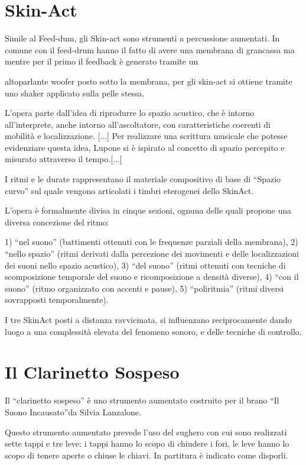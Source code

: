 \section{Skin-Act}

Simile al Feed-dum, gli Skin-act sono strumenti a percussione aumentati.
In comune con il feed-drum hanno il fatto di avere una membrana di grancassa ma
mentre per il primo il feedback è generato tramite un

altoparlante woofer posto sotto la membrana, per gli skin-act si ottiene tramite
uno shaker applicato sulla pelle stessa.

L’opera parte dall’idea di riprodurre lo spazio acustico, che è intorno
all’interprete, anche intorno all’ascoltatore, con caratteristiche coerenti di
mobilità e localizzazione. [...]
Per realizzare una scrittura musicale che potesse evidenziare questa idea,
Lupone si è ispirato al concetto di spazio percepito e misurato attraverso il
tempo.[...]

I ritmi e le durate rappresentano il materiale compositivo di base di
“Spazio curvo” sul quale vengono articolati i timbri eterogenei dello SkinAct.

L’opera è formalmente divisa in cinque sezioni, ognuna delle quali propone una
diversa concezione del ritmo:
\begin{enumerate}
1) “nel suono” (battimenti ottenuti con le frequenze parziali della membrana),
2) “nello spazio” (ritmi derivati dalla percezione dei movimenti e delle
localizzazioni dei suoni nello spazio acustico),
3) “del suono” (ritmi ottenuti con tecniche di scomposizione temporale del
suono e ricomposizione a densità diverse),
4) “con il suono” (ritmo organizzato con accenti e pause),
5) “poliritmia” (ritmi diversi sovrapposti temporalmente).
\end{enumerate}

I tre SkinAct posti a distanza ravvicinata, si influenzano reciprocamente dando
luogo a una complessità elevata del fenomeno sonoro, e delle tecniche di controllo.

\section{Il Clarinetto Sospeso}

Il “clarinetto sospeso” è uno strumento aumentato costruito per il brano “Il
Suono Incausato”da Silvia Lanzalone.

Questo strumento aumentato prevede l’uso del sughero con cui sono realizzati
sette tappi e tre leve: i tappi hanno lo scopo di chiudere i fori, le  leve
hanno lo scopo di tenere aperte o chiuse le chiavi. In partitura è indicato come
disporli.

